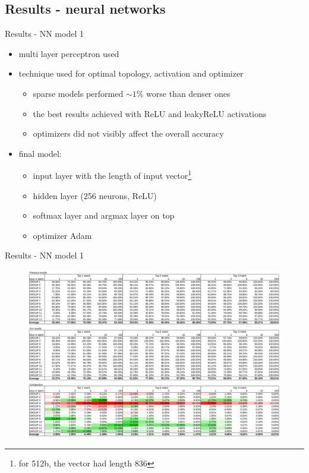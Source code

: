 \documentclass{beamer}
\let\oldfootnote\footnote
\renewcommand\footnote[1][]{\oldfootnote[frame,#1]}
\begin{document}
\begin{darkframes}
    \subsection{Results - neural networks}
    \begin{frame}{Results - NN model 1}
      \begin{itemize}
        \item multi layer perceptron used
        \item {} technique used for optimal topology, activation and optimizer
        \begin{itemize}
          \item sparse models performed $\sim 1 \%$  worse than denser ones
          \item the best results achieved with ReLU and leakyReLU activations
          \item optimizers did not visibly affect the overall accuracy
        \end{itemize}
        \item final model:
        \begin{itemize}
          \item input layer with the length of input vector\footnote{for 512b, the vector had length 836}
          \item hidden layer (256 neurons, ReLU)
          \item softmax layer and argmax layer on top
          \item optimizer Adam
        \end{itemize}
      \end{itemize}
    \end{frame}

    \begin{frame}{Results - NN model 1}
      \begin{figure}[H]
        \centering
        \includegraphics[width=0.98\linewidth]{../tex/images/results/comparison_13.png}
      \end{figure}  
    \end{frame}


\end{darkframes}
\end{document}
